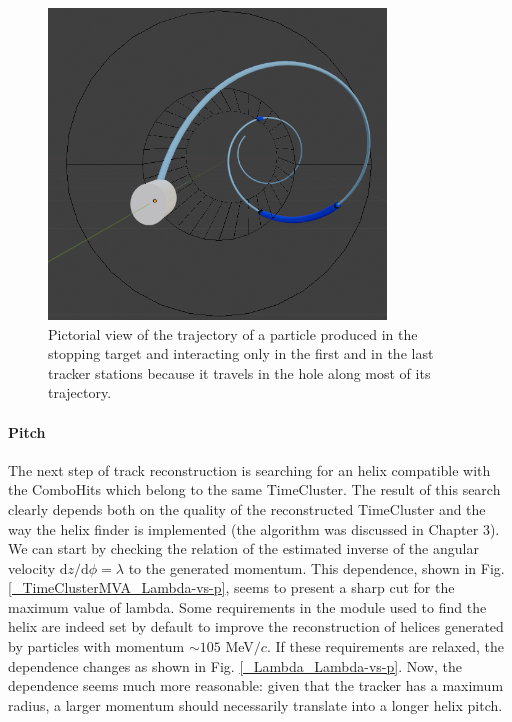 \documentclass[12pt,a4paper,openright, oneside, titlepage]{book} %
\begin{document}
\begin{figure}[!htb]
\centering
\includegraphics[width =0.8\textwidth, keepaspectratio]{Blender_Tracker_4}
\caption[Pictorial view of the trajectory of a particle traveling in the bore]
{Pictorial view of the trajectory of a particle produced in the stopping target and interacting only 
in the first and in the last tracker stations because it travels in the hole along most
of its trajectory.}
\label{_blender}
\end{figure}

\paragraph{Pitch}
The next step of track reconstruction is searching for an helix compatible 
with the ComboHits which belong to the same TimeCluster.
The result of this search clearly depends both on the quality of the reconstructed TimeCluster and the way the helix finder is implemented (the algorithm was discussed in Chapter 3). 
We can start by checking the relation of the estimated inverse of the angular velocity $\mathrm{d}z/\mathrm{d}\phi= \lambda$ to the generated momentum. 
This dependence, shown in Fig. \ref{_TimeClusterMVA_Lambda-vs-p}, seems to present a sharp cut for the maximum value of lambda.  
Some requirements in the module used to find the helix are indeed set by default to improve the reconstruction of helices generated by particles with momentum $\sim 105$ MeV$/c$. 
If these requirements are relaxed, the dependence changes as shown in Fig. \ref{_Lambda_Lambda-vs-p}. 
Now, the dependence seems much more reasonable: given that the tracker has a maximum radius, a larger momentum should necessarily translate into a longer helix pitch.
\end{document}
